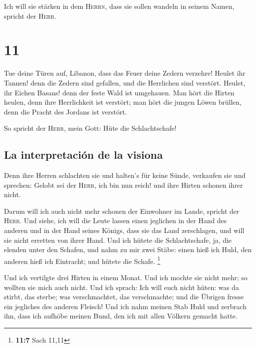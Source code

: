  Ich will sie stärken in dem \textsc{Herrn}, dass sie
sollen wandeln in seinem Namen, spricht der \textsc{Herr}.

\hypertarget{section-10}{%
\section{11}\label{section-10}}

 Tue deine Türen auf, Libanon, dass das Feuer deine Zedern
verzehre!  Heulet ihr Tannen! denn die Zedern sind
gefallen, und die Herrlichen sind verstört. Heulet, ihr Eichen Basans!
denn der feste Wald ist umgehauen.  Man hört die Hirten
heulen, denn ihre Herrlichkeit ist verstört; man hört die jungen Löwen
brüllen, denn die Pracht des Jordans ist verstört.

 So spricht der \textsc{Herr}, mein Gott: Hüte die
Schlachtschafe!

\hypertarget{la-interpretaciuxf3n-de-la-visiona}{%
\subsection{La interpretación de la
visiona}\label{la-interpretaciuxf3n-de-la-visiona}}

 Denn ihre Herren schlachten sie und halten's für keine
Sünde, verkaufen sie und sprechen: Gelobt sei der \textsc{Herr}, ich bin
nun reich! und ihre Hirten schonen ihrer nicht.

 Darum will ich auch nicht mehr schonen der Einwohner im
Lande, spricht der \textsc{Herr}. Und siehe, ich will die Leute lassen
einen jeglichen in der Hand des anderen und in der Hand seines Königs,
dass sie das Land zerschlagen, und will sie nicht erretten von ihrer
Hand.  Und ich hütete die Schlachtschafe, ja, die elenden
unter den Schafen, und nahm zu mir zwei Stäbe: einen hieß ich Huld, den
anderen hieß ich Eintracht; und hütete die Schafe. \footnote{\textbf{11:7}
  Sach 11,11}

 Und ich vertilgte drei Hirten in einem Monat. Und ich
mochte sie nicht mehr; so wollten sie mich auch nicht. 
Und ich sprach: Ich will euch nicht hüten: was da stirbt, das sterbe;
was verschmachtet, das verschmachte; und die Übrigen fresse ein
jegliches des anderen Fleisch!  Und ich nahm meinen Stab
Huld und zerbrach ihn, dass ich aufhöbe meinen Bund, den ich mit allen
Völkern gemacht hatte.

